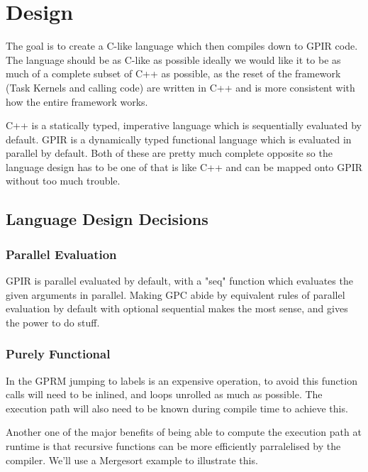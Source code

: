 \chapter{Design}

The goal is to create a C-like language which then compiles down to GPIR code.
The language should be as C-like as possible ideally we would like it to be as much
of a complete subset of C++ as possible, as the reset of the framework (Task Kernels and calling code)
are written in C++ and is more consistent with how the entire framework works.

C++ is a statically typed, imperative language which is sequentially evaluated by default.
GPIR is a dynamically typed functional language which is evaluated in parallel by default.
Both of these are pretty much complete opposite so the language design has to be one of that
is like C++ and can be mapped onto GPIR without too much trouble.

\section{Language Design Decisions}

\subsection{Parallel Evaluation}
        GPIR is parallel evaluated by default, with a "seq" function which
        evaluates the given arguments in parallel. Making GPC abide by equivalent rules of parallel
        evaluation by default with optional sequential makes the most sense, and gives the
        power to do stuff. 


\subsection{Purely Functional}

In the GPRM jumping to labels is an expensive operation, to avoid
this function calls will need to be inlined, and loops unrolled 
as much as possible. The execution path will also need to be known 
during compile time to achieve this. 

Another one of the major benefits of being able to compute the execution
path at runtime is that recursive functions can be more efficiently parralelised
by the compiler. We'll use a Mergesort example to illustrate this.

